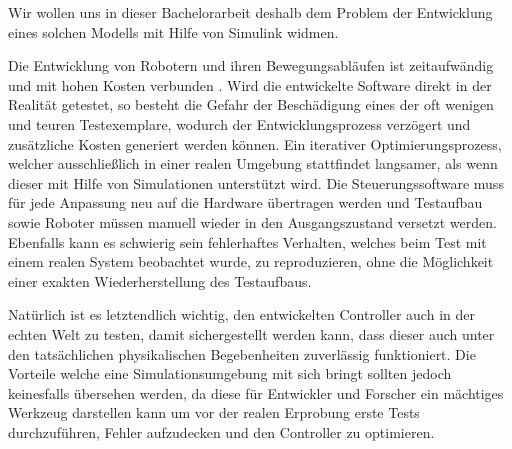 Wir wollen uns in dieser Bachelorarbeit deshalb dem Problem der Entwicklung eines solchen Modells mit Hilfe von Simulink widmen.



Die Entwicklung von Robotern und ihren Bewegungsabläufen ist zeitaufwändig und mit hohen Kosten verbunden \parencite{ahmadian2005model}.
Wird die entwickelte Software direkt in der Realität getestet, so besteht die Gefahr der Beschädigung eines der oft wenigen und teuren Testexemplare, wodurch der Entwicklungsprozess verzögert und zusätzliche Kosten generiert werden können.
Ein iterativer Optimierungsprozess, welcher ausschließlich in einer realen Umgebung stattfindet langsamer, als wenn dieser mit Hilfe von Simulationen unterstützt wird.
Die Steuerungssoftware muss für jede Anpassung neu auf die Hardware übertragen werden und Testaufbau sowie Roboter müssen manuell wieder in den Ausgangszustand versetzt werden.
Ebenfalls kann es schwierig sein fehlerhaftes Verhalten, welches beim Test mit einem realen System beobachtet wurde, zu reproduzieren, ohne die Möglichkeit einer exakten Wiederherstellung des Testaufbaus.




Natürlich ist es letztendlich wichtig, den entwickelten Controller auch in der echten Welt zu testen, damit sichergestellt werden kann, dass dieser auch unter den tatsächlichen physikalischen Begebenheiten zuverlässig funktioniert.
Die Vorteile welche eine Simulationsumgebung mit sich bringt sollten jedoch keinesfalls übersehen werden, da diese für Entwickler und Forscher ein mächtiges Werkzeug darstellen kann um vor der realen Erprobung erste Tests durchzuführen, Fehler aufzudecken und den Controller zu optimieren.



